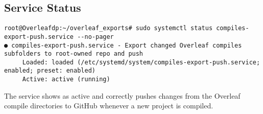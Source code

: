\subsection*{Service Status}

\begin{verbatim}
root@Overleafdp:~/overleaf_exports# sudo systemctl status compiles-export-push.service --no-pager
● compiles-export-push.service - Export changed Overleaf compiles subfolders to root-owned repo and push
     Loaded: loaded (/etc/systemd/system/compiles-export-push.service; enabled; preset: enabled)
     Active: active (running)
\end{verbatim}

The service shows as active and correctly pushes changes from the Overleaf compile directories to GitHub whenever a new project is compiled.